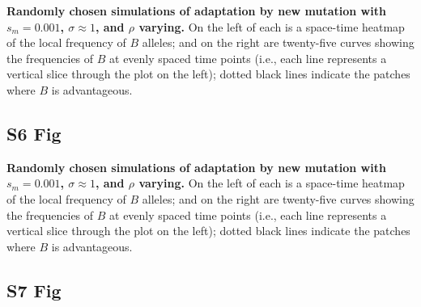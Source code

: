 \documentclass[10pt,letterpaper]{article}
\begin{document}
\textbf{Randomly chosen simulations of adaptation by new mutation
with $s_m=0.001$, $\sigma\approx 1$, and $\rho$ varying.}
    On the left of each is a space-time heatmap of the local frequency of $B$ alleles;
    and on the right are twenty-five curves showing the frequencies of $B$ at evenly spaced time points
    (i.e., each line represents a vertical slice through the plot on the left);
    dotted black lines indicate the patches where $B$ is advantageous.


\subsection*{S6 Fig}
\label{sfig:sims_4}

\textbf{Randomly chosen simulations of adaptation by new mutation
with $s_m=0.001$, $\sigma\approx 1$, and $\rho$ varying.}
    On the left of each is a space-time heatmap of the local frequency of $B$ alleles;
    and on the right are twenty-five curves showing the frequencies of $B$ at evenly spaced time points
    (i.e., each line represents a vertical slice through the plot on the left);
    dotted black lines indicate the patches where $B$ is advantageous.


\subsection*{S7 Fig}
\label{sfig:sims_5}
\end{document}
